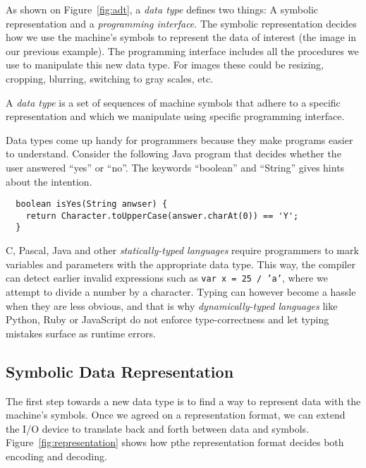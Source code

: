 \documentclass{aldast}
\begin{document}
 As shown on Figure~\ref{fig:adt}, a \emph{data type} defines two
things: A symbolic representation and a \emph{programming
  interface}. The symbolic representation decides how we use the
machine's symbols to represent the data of interest (the image in our
previous example). The programming interface includes all the
procedures we use to manipulate this new data type. For images these
could be resizing, cropping, blurring, switching to gray scales,
etc.

\begin{takeaway}
  A \emph{data type} is a set of sequences of machine symbols that
  adhere to a specific representation and which we manipulate using
  specific programming interface.
\end{takeaway}

Data types come up handy for programmers because they make
programs easier to understand. Consider the following Java program
that decides whether the user answered ``yes'' or ``no''. The keywords
``boolean'' and ``String'' gives hints about the intention.
\begin{verbatim}
  boolean isYes(String anwser) {
    return Character.toUpperCase(answer.charAt(0)) == 'Y';
  }
\end{verbatim}

C, Pascal, Java and other \emph{statically-typed languages} require
programmers to mark variables and parameters with the appropriate data
type. This way, the compiler can detect earlier invalid expressions
such as \texttt{var x = 25 / 'a'}, where we attempt to
divide a number by a character. Typing can however become a hassle
when they are less obvious, and that is why \emph{dynamically-typed
  languages} like Python, Ruby or JavaScript do not enforce
type-correctness and let typing mistakes surface as runtime errors.

\subsection{Symbolic Data Representation}

 The first step towards a new data type is to find a way to represent
data with the machine's symbols. Once we agreed on a representation
format, we can extend the I/O device to translate back and forth
between data and symbols.  Figure~\ref{fig:representation} shows how
pthe representation format decides both encoding and decoding.
\end{document}
